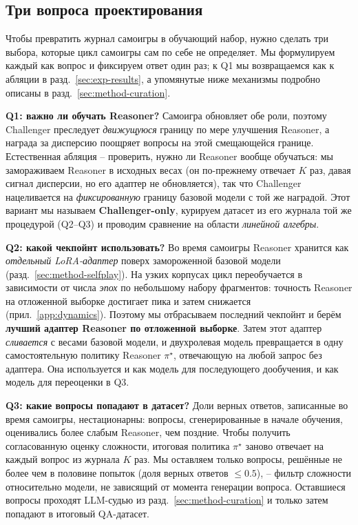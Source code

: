 \documentclass{article}
\begin{document}
\subsection{Три вопроса проектирования}\label{sec:exp-questions}

Чтобы превратить журнал самоигры в обучающий набор, нужно сделать три выбора, которые цикл самоигры сам по себе не определяет. Мы формулируем каждый как вопрос и фиксируем ответ один раз; к Q1 мы возвращаемся как к абляции в разд.~\ref{sec:exp-results}, а упомянутые ниже механизмы подробно описаны в разд.~\ref{sec:method-curation}.

\textbf{Q1: важно ли обучать Reasoner?}
Самоигра обновляет обе роли, поэтому Challenger преследует \emph{движущуюся} границу по мере улучшения Reasoner, а награда за дисперсию поощряет вопросы на этой смещающейся границе. Естественная абляция -- проверить, нужно ли Reasoner вообще обучаться: мы замораживаем Reasoner в исходных весах (он по-прежнему отвечает $K$ раз, давая сигнал дисперсии, но его адаптер не обновляется), так что Challenger нацеливается на \emph{фиксированную} границу базовой модели с той же наградой. Этот вариант мы называем \textbf{Challenger-only}, курируем датасет из его журнала той же процедурой (Q2--Q3) и проводим сравнение на области \emph{линейной алгебры}.

\textbf{Q2: какой чекпойнт использовать?}
Во время самоигры Reasoner хранится как \emph{отдельный LoRA-адаптер} поверх замороженной базовой модели (разд.~\ref{sec:method-selfplay}). На узких корпусах цикл переобучается в зависимости от числа \emph{эпох} по небольшому набору фрагментов: точность Reasoner на отложенной выборке достигает пика и затем снижается (прил.~\ref{app:dynamics}). Поэтому мы отбрасываем последний чекпойнт и берём \textbf{лучший адаптер Reasoner по отложенной выборке}. Затем этот адаптер \emph{сливается} с весами базовой модели, и двухролевая модель превращается в одну самостоятельную политику Reasoner $\pi^\star$, отвечающую на любой запрос без адаптера. Она используется и как модель для последующего дообучения, и как модель для переоценки в Q3.

\textbf{Q3: какие вопросы попадают в датасет?}
Доли верных ответов, записанные во время самоигры, нестационарны: вопросы, сгенерированные в начале обучения, оценивались более слабым Reasoner, чем поздние. Чтобы получить согласованную оценку сложности, итоговая политика $\pi^\star$ заново отвечает на каждый вопрос из журнала $K$ раз. Мы оставляем только вопросы, решённые не более чем в половине попыток (доля верных ответов $\le 0.5$), -- фильтр сложности относительно модели, не зависящий от момента генерации вопроса. Оставшиеся вопросы проходят LLM-судью из разд.~\ref{sec:method-curation} и только затем попадают в итоговый QA-датасет.
\end{document}
